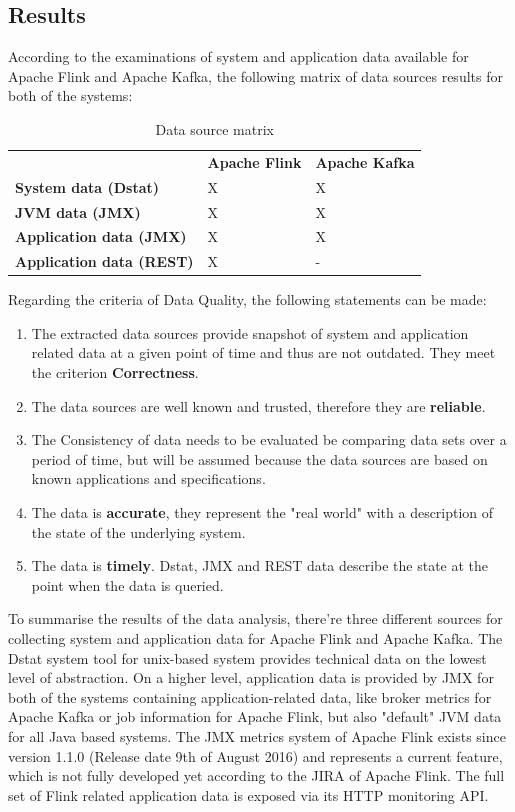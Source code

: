 \subsection{Results}

According to the examinations of system and application data available for Apache Flink and Apache Kafka,
the following matrix of data sources results for both of the systems:

\begin{table}[H]
\begin{tabular}{lll}
 & \textbf{Apache Flink} & \textbf{Apache Kafka} \\
\textbf{System data (Dstat)} & X & X \\
\textbf{JVM data (JMX)} & X & X \\
\textbf{Application data (JMX)} & X & X \\
\textbf{Application data (REST)} & X & - \\
\end{tabular}
\caption{Data source matrix}
\label{data-source-matrix}
\end{table}

Regarding the criteria of Data Quality, the following statements can be made:

\begin{enumerate}
    \item The extracted data sources provide snapshot of system and application related data at a
    given point of time and thus are not outdated. They meet the criterion \textbf{Correctness}.
    \item The data sources are well known and trusted, therefore they are \textbf{reliable}.
    \item The Consistency of data needs to be evaluated be comparing data sets over a period of time,
    but will be assumed because the data sources are based on known applications and specifications.
    \item The data is \textbf{accurate}, they represent the "real world" with a description of the state of the
    underlying system.
    \item The data is \textbf{timely}. Dstat, JMX and REST data describe the state at the point when the data is
    queried.
\end{enumerate}

To summarise the results of the data analysis, there're three different sources for collecting system and application
data for Apache Flink and Apache Kafka. The Dstat system tool for unix-based system provides technical data on the
lowest level of abstraction. On a higher level, application data is provided by JMX for both of the systems containing
application-related data, like broker metrics for Apache Kafka or job information for Apache Flink, but also "default"
JVM data for all Java based systems. The JMX metrics system of Apache Flink exists since version 1.1.0 (Release date
9th of August 2016) and represents a current feature, which is not fully developed yet according to the JIRA of
Apache Flink. The full set of Flink related application data is exposed via its HTTP monitoring API.

